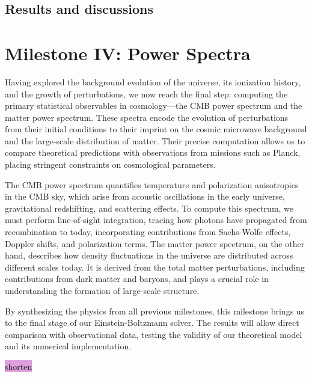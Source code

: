 \documentclass{aa}
\numberwithin{equation}{section}
\numberwithin{table}{section}
\numberwithin{figure}{section}
\begin{document}
\subsection{Results and discussions}\label{subsec: III results}







\section{Milestone IV: Power Spectra}\label{sec: milestone IV}
Having explored the background evolution of the universe, its ionization history, and the growth of perturbations, we now reach the final step: computing the primary statistical observables in cosmology—the CMB power spectrum and the matter power spectrum. These spectra encode the evolution of perturbations from their initial conditions to their imprint on the cosmic microwave background and the large-scale distribution of matter. Their precise computation allows us to compare theoretical predictions with observations from missions such as Planck, placing stringent constraints on cosmological parameters.  

The CMB power spectrum quantifies temperature and polarization anisotropies in the CMB sky, which arise from acoustic oscillations in the early universe, gravitational redshifting, and scattering effects. To compute this spectrum, we must perform line-of-sight integration, tracing how photons have propagated from recombination to today, incorporating contributions from Sachs-Wolfe effects, Doppler shifts, and polarization terms. The matter power spectrum, on the other hand, describes how density fluctuations in the universe are distributed across different scales today. It is derived from the total matter perturbations, including contributions from dark matter and baryons, and plays a crucial role in understanding the formation of large-scale structure.  

By synthesizing the physics from all previous milestones, this milestone brings us to the final stage of our Einstein-Boltzmann solver. The results will allow direct comparison with observational data, testing the validity of our theoretical model and its numerical implementation.

\colorbox{Plum}{shorten}
\end{document}
